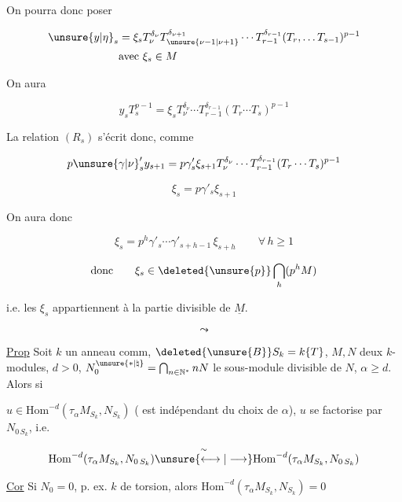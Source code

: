 
On pourra donc poser

\[
\begin{aligned}
\unsure{y|\eta}_s&=\xi_s T_\nu^{\delta_\nu}T_{\unsure{\nu-1|\nu+1}}^{\delta_{\nu+1}}\cdots T_{r-1}^{\delta_{r-1}}(T_r,\ldots T_{s-1})^{p-1}\\
&\text{avec }\xi_s\in M
\end{aligned}
\]

On aura

\[
y_s T_s^{p-1}=\xi_s T_\nu^{\delta_\nu}\cdots T_{r-1}^{\delta_{r-1}}(T_r\cdots T_s)^{p-1}
\]

La relation $(R_s)$ s'écrit donc, comme

\[
p\unsure{\gamma|\nu}'_s y_{s+1}=p\gamma'_s\xi_{s+1}T_\nu^{\delta_\nu}\cdots T_{r-1}^{\delta_{r-1}}(T_r\cdots T_s)^{p-1}
\]

\[
\boxed{\xi_s=p\gamma'_s\xi_{s+1}}
\]

On aura donc

\[
\xi_s=p^h\gamma'_s\cdots\gamma'_{s+h-1}\,\xi_{s+h}\qquad\forall\,h\geq1
\]

\[
\text{donc}\qquad \xi_s\in\deleted{\unsure{p}}\bigcap_h(p^h M)
\]

i.e. les $\xi_s$ appartiennent à la partie divisible de $\underline{M}$.

\[
\leadsto
\]

\uline{Prop} Soit $k$ un anneau comm, $\deleted{\unsure{B}}S_k=k\{T\}$, $M,N$ deux $k$-modules,  $d>0$, $N_0^{\unsure{*|\natural}}=\bigcap_{n\in\mathbb{N}^{*}}nN$ le   sous-module divisible de $N$, $\alpha\geq d$. Alors si

$u\in\mathrm{Hom}^{-d}(\tau_\alpha M_{S_k},N_{S_k})$ (  est indépendant  du choix de $\alpha$), $u$ se factorise par $N_{0\,S_k}$, i.e.

\[
\mathrm{Hom}^{-d}(\tau_\alpha M_{S_k},N_{0\,S_k})\overset{\sim}{\unsure{\longleftrightarrow|\longrightarrow}}\mathrm{Hom}^{-d}(\tau_\alpha M_{S_k},N_{0\,S_k})
\]

\uline{Cor} Si $N_0=0$, p. ex. $k$ de torsion, alors $\mathrm{Hom}^{-d}(\tau_\alpha M_{S_k},N_{S_k})=0$

